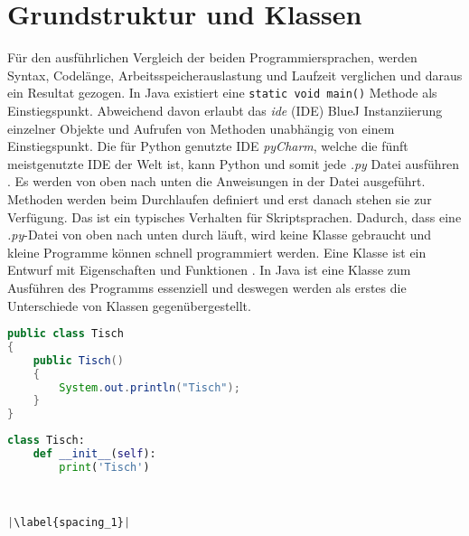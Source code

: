 \section{Grundstruktur und Klassen}
Für den ausführlichen Vergleich der beiden Programmiersprachen, werden Syntax, Codelänge, Arbeitsspeicherauslastung und Laufzeit verglichen und daraus ein Resultat gezogen.
In Java existiert eine \texttt{static void main()} Methode als Einstiegspunkt. Abweichend davon erlaubt das \textit{\acrlong{ide}} (IDE) BlueJ Instanziierung einzelner Objekte und Aufrufen von Methoden unabhängig von einem Einstiegspunkt.
Die für Python genutzte IDE \textit{pyCharm}, welche die fünft meistgenutzte IDE der Welt ist, kann Python und somit jede \textit{.py} Datei ausführen \cite{Github:IDE}\cite{PyCharm}.
Es werden von oben nach unten die Anweisungen in der Datei ausgeführt.
Methoden werden beim Durchlaufen definiert und erst danach stehen sie zur Verfügung.
Das ist ein typisches Verhalten für Skriptsprachen.
Dadurch, dass eine \textit{.py}-Datei von oben nach unten durch läuft, wird keine Klasse gebraucht und kleine Programme können schnell programmiert werden. 
Eine Klasse ist ein Entwurf mit Eigenschaften und Funktionen \cite{gfg}. 
In Java ist eine Klasse zum Ausführen des Programms essenziell und deswegen werden als erstes die Unterschiede von Klassen gegenübergestellt.

\begin{minipage}{.5\linewidth}
\begin{lstlisting}[language=java,caption={Klasse in Java},captionpos=b,label={lst:java:class},frame=none]
public class Tisch
{
    public Tisch()
    {
        System.out.println("Tisch");
    }
}
\end{lstlisting}
\end{minipage}
\begin{minipage}{.5\linewidth}
\begin{lstlisting}[language=python,caption={Klasse in Python},captionpos=b,label={lst:python:class},frame=l,escapechar=|]
class Tisch:
    def __init__(self):
        print('Tisch')
        
        

|\label{spacing_1}|
\end{lstlisting}
\end{minipage}

